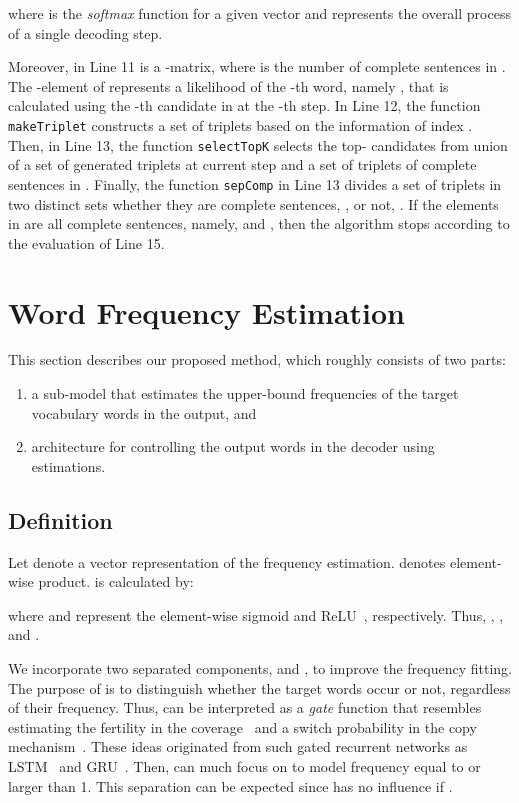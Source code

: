 \documentclass[11pt]{article}
\begin{document}
where  is the {\it softmax} function for a given vector
and  represents the overall process of a single decoding step. 

Moreover,  in Line 11 is a -matrix, where  is the number of complete sentences in .
   The -element of  represents a likelihood of the -th word, namely , that is calculated using the -th candidate in  at the -th step.
In Line 12, the function {\tt makeTriplet} constructs a set of triplets based on the information of index .
   Then, in Line 13, the function {\tt selectTopK} selects the top- candidates from union of a set of generated triplets at current step and a set of triplets of complete sentences in .
Finally, the function {\tt sepComp} in Line 13 divides a set of triplets  in two distinct sets whether they are complete sentences, , or not, .
If the elements in  are all complete sentences, namely,  and , then the algorithm stops according to the evaluation of Line 15.

   
\section{Word Frequency Estimation}
   This section describes our proposed method, which roughly
consists of two parts:
   \begin{enumerate}
    \item a sub-model that estimates the upper-bound frequencies of the target vocabulary words in the output, and 
    \item  architecture for controlling the output words in the decoder using estimations.
   \end{enumerate}

\subsection{Definition}
Let  denote a vector representation of the frequency estimation. 
 denotes element-wise product.
 is calculated by:

where  and  represent the element-wise sigmoid and ReLU~\cite{AISTATS2011_GlorotBB11}, respectively.
Thus, ,
   , and
   .


   We incorporate two separated components,  and , to improve the frequency fitting.
The purpose of  is to distinguish whether the target words occur or not, regardless of their frequency.
Thus,  can be interpreted as a {\it gate} function that resembles estimating the fertility in the coverage~\cite{tu-EtAl:2016:P16-1} and a switch probability in the copy mechanism~\cite{gulcehre-EtAl:2016:P16-1}.
These ideas originated from such gated recurrent networks as LSTM~\cite{Hochreiter:1997:LSM:1246443.1246450} and GRU~\cite{DBLP:journals/corr/ChungGCB14}. 
Then,  can much focus on to model frequency equal to or larger than 1.
This separation can be expected since  has no influence if .
\end{document}
